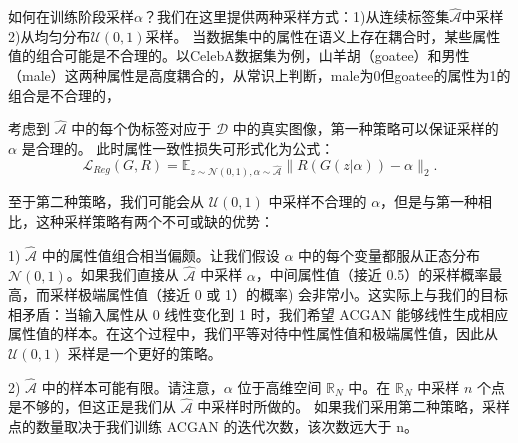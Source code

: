 如何在训练阶段采样$\alpha$？我们在这里提供两种采样方式：1)从连续标签集$\hat{\mathcal{A}}$中采样 2)从均匀分布$\mathcal{U}(0,1)$采样。
当数据集中的属性在语义上存在耦合时，某些属性值的组合可能是不合理的。以CelebA数据集为例，山羊胡（goatee）和男性（male）这两种属性是高度耦合的，从常识上判断，male为0但goatee的属性为1的组合是不合理的，

考虑到 $\hat{\mathcal{A}}$ 中的每个伪标签对应于 $\mathcal{D}$ 中的真实图像，第一种策略可以保证采样的 $\alpha$ 是合理的。
此时属性一致性损失可形式化为公式：
\begin{equation}
   \mathcal{L}_{Reg}(G, R)  =  \mathbb{E}_{z \sim \mathcal{N}(0,1), \alpha \sim \hat{\mathcal{A}}}\|R(G(z|\alpha)) - \alpha\|_2.
\end{equation}

至于第二种策略，我们可能会从 $\mathcal{U}(0,1)$ 中采样不合理的 $\alpha$，但是与第一种相比，这种采样策略有两个不可或缺的优势：

1) $\hat{\mathcal{A}}$ 中的属性值组合相当偏颇。让我们假设 $\alpha$ 中的每个变量都服从正态分布 $\mathcal{N}(0,1)$。如果我们直接从 $\hat{\mathcal{A}}$ 中采样 $\alpha$，中间属性值（接近 0.5）的采样概率最高，而采样极端属性值（接近 0 或 1）的概率) 会非常小。这实际上与我们的目标相矛盾：当输入属性从 0 线性变化到 1 时，我们希望 ACGAN 能够线性生成相应属性值的样本。在这个过程中，我们平等对待中性属性值和极端属性值，因此从 $\mathcal{U}(0,1)$ 采样是一个更好的策略。

2) $\hat{\mathcal{A}}$ 中的样本可能有限。请注意，$\alpha$ 位于高维空间 $\mathbb{R}_N$ 中。在 $\mathbb{R}_N$ 中采样 $n$ 个点是不够的，但这正是我们从 $\hat{\mathcal{A}}$ 中采样时所做的。
如果我们采用第二种策略，采样点的数量取决于我们训练 ACGAN 的迭代次数，该次数远大于 n。

